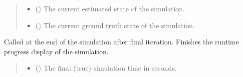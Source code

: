 \documentclass[letterpaper,10pt,english]{sphinxmanual}
\begin{document}
\begin{fulllineitems}
\begin{fulllineitems}
\begin{quote}
\begin{description}
\begin{itemize}
\item {} 
\sphinxAtStartPar
{} ({\hyperref[\detokenize{modules/estimation/state:qnav.estimation.state.EstimatedState}]{}}) \textendash{} The current estimated state of the simulation.

\item {} 
\sphinxAtStartPar
{} ({\hyperref[\detokenize{modules/waypoints/trajectory:qnav.waypoints.trajectory.GroundTruth}]{}}) \textendash{} The current ground truth state of the simulation.

\end{itemize}

\end{description}\end{quote}

\end{fulllineitems}


\begin{fulllineitems}
\label{\detokenize{modules/simulation/display:qnav.simulation.display.ConsoleDisplayPlus.on_finish}}
\pysigstartsignatures
{}
\pysigstopsignatures
\sphinxAtStartPar
Called at the end of the simulation after final iteration.
Finishes the runtime progress display of the simulation.
\begin{quote}\begin{description}
\begin{itemize}
\item {} 
\sphinxAtStartPar
{} () \textendash{} The final (true) simulation time in seconds.


\end{itemize}
\end{description}
\end{quote}
\end{fulllineitems}
\end{fulllineitems}
\end{document}
